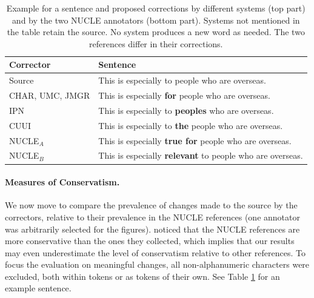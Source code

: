 \documentclass[a4paper, 11pt]{article}
\begin{document}
\begin{table}
	\vspace{-0.5cm}
	\centering
	\small
	\singlespacing
	\begin{tabular}{l|p{4cm}}
		Corrector & Sentence \\
		\hline
		Source & This is especially to people who are overseas. \\
		\hline 
		CHAR, UMC, JMGR & This is especially \textbf{for} people who are overseas. \\ 
		IPN & This is especially to \textbf{peoples} who are overseas. \\ 
		CUUI &  This is especially to \textbf{the} people who are overseas. \\ 
		\hline
		NUCLE$_A$ & This is especially \textbf{true for} people who are overseas.\\
		NUCLE$_B$ & This is especially \textbf{relevant} to people who are overseas.
	\end{tabular}
	\caption{\label{tab:nucle_example} Example for a sentence and proposed corrections by different systems (top part) and by the two NUCLE annotators (bottom part). Systems not mentioned in the table retain the source. No system produces a new word as needed. The two references differ in their corrections.} 
	\vspace{-0.5cm}
\end{table} 
%
%
\vspace{-.2cm}
\paragraph{Measures of Conservatism.}
We now move to compare the prevalence of changes made to the source by the correctors,
relative to their prevalence in the NUCLE references (one annotator was arbitrarily 
selected for the figures). 
 noticed that the NUCLE references are more conservative than 
the ones they collected, which implies that our results may even underestimate the level of conservatism relative to other references.
To focus the evaluation on meaningful changes, all non-alphanumeric characters were 
excluded, both within tokens or as tokens of their own. See Table \ref{tab:nucle_example} for an example sentence.
\end{document}
